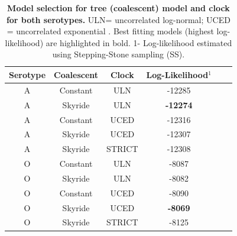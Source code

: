 \documentclass[a4paper,10pt]{article}
\begin{document}
\begin{table}[H]
\caption{\textbf{Model selection for tree (coalescent) model and clock for both serotypes.}
ULN= uncorrelated log-normal; UCED = uncorrelated exponential .
Best fitting models (highest log-likelihood) are highlighted in bold.
1- Log-likelihood estimated using Stepping-Stone sampling (SS).}
\begin{center}
\begin{tabular}{cccccc}
\toprule
Serotype	&Coalescent	&Clock	&Log-Likelihood$^{1}$\\
\midrule
A	&Constant	&ULN	&-12285\\
A	&Skyride 	&ULN	&\textbf{-12274}\\
A	&Constant	&UCED	&-12316\\
A	&Skyride 	&UCED	&-12307\\
A       &Skyride       &STRICT &-12308\\
O	&Constant	&ULN	&-8087\\
O	&Skyride 	&ULN	&-8082\\
O	&Constant	&UCED	&-8090\\
O	&Skyride 	&UCED	&\textbf{-8069}\\
O       &Skyride       &STRICT &-8125\\
\bottomrule
\end{tabular}
\end{center}
\begin{flushleft}
\end{flushleft}
\label{stab:treeclockselection}
 \end{table}
\end{document}
